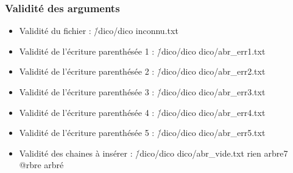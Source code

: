 \documentclass{report}
\begin{document}
\subsubsection{Validité des arguments}
\begin{itemize}

    \item Validité du fichier : \./dico/dico inconnu.txt
\vspace{0.5cm}

\vspace{0.5cm}

    \item Validité de l'écriture parenthésée 1 : \./dico/dico dico/abr\_err1.txt
\vspace{0.5cm}

\vspace{0.5cm}

    \item Validité de l'écriture parenthésée 2 : \./dico/dico dico/abr\_err2.txt
\vspace{0.5cm}

\vspace{0.5cm}

    \item Validité de l'écriture parenthésée 3 : \./dico/dico dico/abr\_err3.txt
\vspace{0.5cm}

\vspace{0.5cm}

    \item Validité de l'écriture parenthésée 4 : \./dico/dico dico/abr\_err4.txt
\vspace{0.5cm}

\vspace{0.5cm}

    \item Validité de l'écriture parenthésée 5 : \./dico/dico dico/abr\_err5.txt
\vspace{0.5cm}

\vspace{0.5cm}

    \item Validité des chaines à insérer : \./dico/dico dico/abr\_vide.txt rien arbre7 @rbre arbré
\vspace{0.5cm}

\vspace{0.5cm}
\end{itemize}

\newpage
\end{document}
